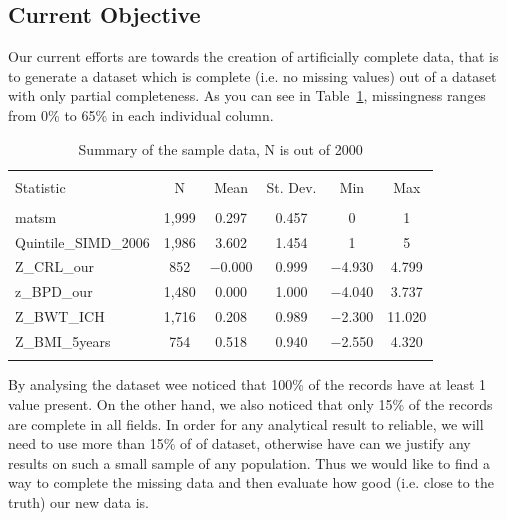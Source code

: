 \documentclass[a0,portrait]{a0poster}
\begin{document}
\begin{multicols}{2}

\color{DarkSlateGray} %

\section*{Current Objective}
Our current efforts are towards the creation of artificially complete data, that is to generate a dataset which is complete (i.e. no missing values) out of a dataset with only partial completeness. As you can see in Table~\ref{abdn-summary}, missingness ranges from 0\% to 65\% in each individual column. 
%
\begin{table} %
\caption{\color{Green} Summary of the sample data, N is out of 2000}
\label{abdn-summary}
\begin{tabular}{@{\extracolsep{5pt}}lccccc} 
\\[-1.8ex]\hline 
\hline \\[-1.8ex] 
Statistic & \multicolumn{1}{c}{N} & \multicolumn{1}{c}{Mean} & \multicolumn{1}{c}{St. Dev.} & \multicolumn{1}{c}{Min} & \multicolumn{1}{c}{Max} \\ 
\hline \\[-1.8ex] 
matsm & 1,999 & 0.297 & 0.457 & 0 & 1 \\ 
Quintile\_SIMD\_2006 & 1,986 & 3.602 & 1.454 & 1 & 5 \\ 
Z\_CRL\_our & 852 & $-$0.000 & 0.999 & $-$4.930 & 4.799 \\ 
z\_BPD\_our & 1,480 & 0.000 & 1.000 & $-$4.040 & 3.737 \\ 
Z\_BWT\_ICH & 1,716 & 0.208 & 0.989 & $-$2.300 & 11.020 \\ 
Z\_BMI\_5years & 754 & 0.518 & 0.940 & $-$2.550 & 4.320 \\ 
\hline \\[-1.8ex] 
\end{tabular} 
\end{table}
%
By analysing the dataset wee noticed that 100\% of the records have at least 1 value present. On the other hand, we also noticed that only 15\% of the records are complete in all fields. In order for any analytical result to reliable, we will need to use more than 15\% of of dataset, otherwise have can we justify any results on such a small sample of any population. Thus we would like to find a way to complete the missing data and then evaluate how good (i.e. close to the truth) our new data is.


\end{multicols}
\end{document}
